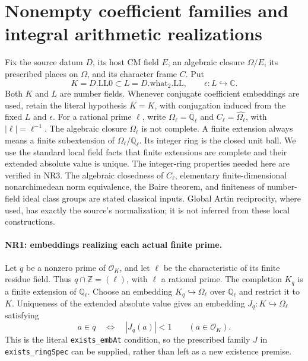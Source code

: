 \section{Nonempty coefficient families and integral arithmetic realizations}
\label{sec:nonempty-realization}


Fix the source datum $D$, its host CM field $E$, an algebraic closure
$\Omega/E$, its prescribed places on $\Omega$, and its character frame
$C$. Put
\[
 K=D.\mathrm{LL0}\subset L=D.\mathrm{what}_2.\mathrm{LL},\qquad
 \epsilon:L\hookrightarrow\mathbb C .                  \tag{NR.1}
\]
Both $K$ and $L$ are number fields. Whenever conjugate coefficient
embeddings are used, retain the literal hypothesis $\bar K=K$, with
conjugation induced from the fixed $L$ and $\epsilon$.
For a rational prime $\ell$, write $\Omega_\ell=\overline{\mathbb Q}_\ell$
and $C_\ell=\widehat{\Omega_\ell}$, with $|\ell|=\ell^{-1}$.
The algebraic closure $\Omega_\ell$ is not complete. A finite extension
always means a finite subextension of $\Omega_\ell/\mathbb Q_\ell$.
Its integer ring is the closed unit ball. We use the standard local
field facts that finite extensions are complete and their extended
absolute value is unique. The integer-ring properties needed here
are verified in NR3. The algebraic closedness of $C_\ell$, elementary
finite-dimensional nonarchimedean norm equivalence, the Baire theorem,
and finiteness of number-field ideal class groups are stated classical
inputs. Global Artin reciprocity, where used, has exactly the source's
normalization; it is not inferred from these local constructions.

\paragraph{NR1: embeddings realizing each actual finite prime.}
Let $q$ be a nonzero prime of $\mathcal O_K$, and let $\ell$ be the
characteristic of its finite residue field. Thus
$q\cap\mathbb Z=(\ell)$, with $\ell$ a rational prime. The completion
$K_q$ is a finite extension of $\mathbb Q_\ell$. Choose an embedding
$K_q\hookrightarrow\Omega_\ell$ over $\mathbb Q_\ell$ and restrict it
to $K$. Uniqueness of the extended absolute value gives an embedding
$J_q:K\hookrightarrow\Omega_\ell$ satisfying
\[
 a\in q\quad\Longleftrightarrow\quad |J_q(a)|<1
       \qquad(a\in\mathcal O_K).                      \tag{NR.2}
\]
This is the literal \texttt{exists\_embAt} condition, so the prescribed
family $J$ in \texttt{exists\_ringSpec} can be supplied, rather than
left as a new existence premise.


